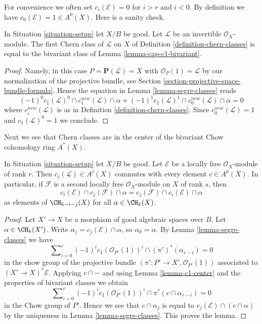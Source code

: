 \noindent
For convenience we often set $c_i(\mathcal{E}) = 0$
for $i > r$ and $i < 0$. By definition
we have $c_0(\mathcal{E}) = 1 \in A^0(X)$.
Here is a sanity check.

\begin{lemma}
\label{lemma-first-chern-class}
In Situation \ref{situation-setup} let $X/B$ be good.
Let $\mathcal{L}$ be an invertible $\mathcal{O}_X$-module.
The first Chern class of $\mathcal{L}$ on $X$ of
Definition \ref{definition-chern-classes}
is equal to the bivariant class of Lemma \ref{lemma-cap-c1-bivariant}.
\end{lemma}

\begin{proof}
Namely, in this case $P = \mathbf{P}(\mathcal{L}) = X$ with
$\mathcal{O}_P(1) = \mathcal{L}$ by our normalization of the
projective bundle, see Section \ref{section-projective-space-bundle-formula}.
Hence the equation in Lemma \ref{lemma-segre-classes}
reads
$$
(-1)^0 c_1(\mathcal{L})^0 \cap c^{new}_1(\mathcal{L}) \cap \alpha +
(-1)^1 c_1(\mathcal{L})^1 \cap c^{new}_0(\mathcal{L}) \cap \alpha = 0
$$
where $c_i^{new}(\mathcal{L})$ is as in
Definition \ref{definition-chern-classes}.
Since $c_0^{new}(\mathcal{L}) = 1$ and $c_1(\mathcal{L})^0 = 1$
we conclude.
\end{proof}

\noindent
Next we see that Chern classes are in the center of the bivariant
Chow cohomology ring $A^*(X)$.

\begin{lemma}
\label{lemma-cap-commutative-chern}
In Situation \ref{situation-setup} let $X/B$ be good.
Let $\mathcal{E}$ be a locally free $\mathcal{O}_X$-module of rank $r$.
Then $c_j(\mathcal{L}) \in A^j(X)$ commutes with every
element $c \in A^p(X)$. In particular, if $\mathcal{F}$ is a
second locally free $\mathcal{O}_X$-module on $X$ of rank $s$, then
$$
c_i(\mathcal{E}) \cap c_j(\mathcal{F}) \cap \alpha
=
c_j(\mathcal{F}) \cap c_i(\mathcal{E}) \cap \alpha
$$
as elements of $\CH_{k - i - j}(X)$ for all $\alpha \in \CH_k(X)$.
\end{lemma}

\begin{proof}
Let $X' \to X$ be a morphism of good algebraic spaces over $B$.
Let $\alpha \in \CH_k(X')$. Write $\alpha_j = c_j(\mathcal{E}) \cap \alpha$, so
$\alpha_0 = \alpha$. By Lemma \ref{lemma-segre-classes} we have
$$
\sum\nolimits_{i = 0}^r
(-1)^i c_1(\mathcal{O}_{P'}(1))^i \cap
(\pi')^*(\alpha_{r - i}) = 0
$$
in the chow group of the projective bundle
$(\pi' : P' \to X', \mathcal{O}_{P'}(1))$
associated to $(X' \to X)^*\mathcal{E}$.
Applying $c \cap -$ and using Lemma \ref{lemma-c1-center}
and the properties of bivariant classes we obtain
$$
\sum\nolimits_{i = 0}^r
(-1)^i c_1(\mathcal{O}_{P'}(1))^i \cap
\pi^*(c \cap \alpha_{r - i}) = 0
$$
in the Chow group of $P'$. Hence we see that $c \cap \alpha_j$ is
equal to $c_j(\mathcal{E}) \cap (c \cap \alpha)$ by the uniqueness in
Lemma \ref{lemma-segre-classes}. This proves the lemma.
\end{proof}

